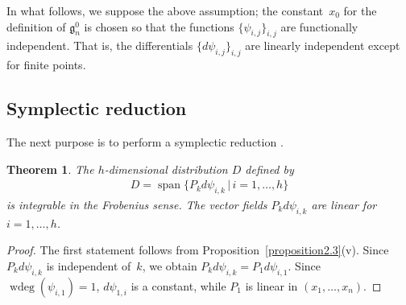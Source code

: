 \documentclass[pdftex]{sigma}
\numberwithin{equation}{section}
\newtheorem{Theorem}{Theorem}[section]
\begin{document}
In what follows, we suppose the above assumption; the constant~$x_0$ for the def\/inition of $\mathfrak{g}^0_n$ is chosen so that the functions $\{ \psi_{i,j}\}_{i,j}$ are functionally independent. That is, the dif\/ferentials $\{ d\psi_{i,j}\}_{i,j}$ are linearly independent except for f\/inite points.

\subsection{Symplectic reduction}\label{section2.3}

The next purpose is to perform a symplectic reduction \cite{Mag1, Mag2, Mag3, Mag4}.

\begin{Theorem}\label{theorem2.5}
The $h$-dimensional distribution $D$ defined by
\begin{gather*}
D = \operatorname{span}\{ P_kd\psi_{i,k} \, | \, i=1,\dots ,h\}
\end{gather*}
is integrable in the Frobenius sense. The vector fields $P_k d\psi_{i,k}$ are linear for $i=1, \dots ,h$.
\end{Theorem}

\begin{proof}The f\/irst statement follows from Proposition~\ref{proposition2.3}(v). Since $P_kd\psi_{i,k}$ is independent of~$k$, we obtain $P_kd\psi_{i,k}=P_1d\psi_{i,1}$. Since $\operatorname{wdeg}(\psi_{i,1}) = 1$, $d\psi_{1,i}$ is a constant, while $P_1$ is linear in $(x_1,\dots ,x_n)$.
\end{proof}
\end{document}
